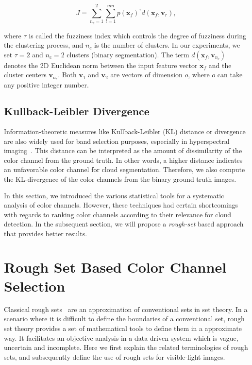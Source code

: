\begin{equation}
\label{eq:eq4}
J = \sum\limits_{n_c=1}^{2} \sum\limits_{l=1}^{mn} p(\mathbf{x}_{f})^{\tau}d(\mathbf{x}_{f},\mathbf{v}_{r}),
\end{equation}

where $\tau$ is called the fuzziness index which controls the degree of fuzziness during the clustering process, and $n_c$ is the number of clusters. In our experiments, we set $\tau=2$ and $n_c=2$ clusters (binary segmentation). The term $d(\mathbf{x}_{f},\mathbf{v}_{n_c})$ denotes the 2D Euclidean norm between the input feature vector $\mathbf{x}_{f}$ and the cluster centers $\mathbf{v}_{n_c}$. Both $\mathbf{v}_{1}$ and $\mathbf{v}_{2}$ are vectors of dimension $o$, where $o$ can take any positive integer number.

\subsection{Kullback-Leibler Divergence}
Information-theoretic measures like Kullback-Leibler (KL) distance or divergence are also widely used for band selection purposes, especially in hyperspectral imaging~\cite{InfoTheory_TGRS}. This distance can be interpreted as the amount of dissimilarity of the color channel from the ground truth. In other words, a higher distance indicates an unfavorable color channel for cloud segmentation. Therefore, we also compute the KL-divergence of the color channels from the binary ground truth images.

In this section, we introduced the various statistical tools for a systematic analysis of color channels. However, these techniques had certain shortcomings with regards to ranking color channels according to their relevance for cloud detection. In the subsequent section, we will propose a \emph{rough-set} based approach that provides better results. 

\section{Rough Set Based Color Channel Selection}
\label{sec:rset-approach}
Classical rough sets~\cite{Pawlak92} are an approximation of conventional sets in set theory. In a scenario where it is difficult to define the boundaries of a conventional set, rough set theory provides a set of mathematical tools to  define them in a approximate way. It facilitates an objective analysis in a data-driven system which is vague, uncertain and incomplete. Here we first explain the related terminologies of rough sets, and subsequently define the use of rough sets for visible-light images.

